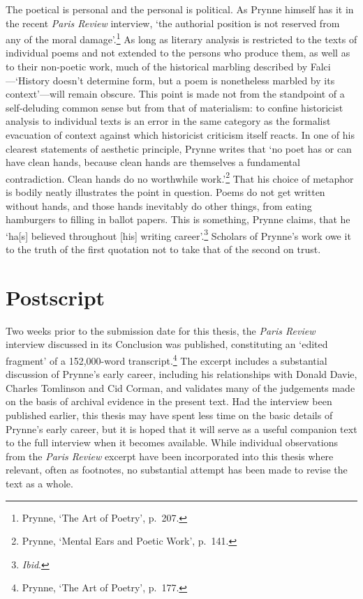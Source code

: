 \documentclass[]{article}
\begin{document}
The poetical is personal and the personal is political. As Prynne
himself has it in the recent \emph{Paris Review} interview, ‘the
authorial position is not reserved from any of the moral
damage’.\footnote{Prynne, ‘The Art of Poetry’, p.~207.} As long as
literary analysis is restricted to the texts of individual poems and not
extended to the persons who produce them, as well as to their non-poetic
work, much of the historical marbling described by Falci—‘History
doesn’t determine form, but a poem is nonetheless marbled by its
context’—will remain obscure. This point is made not from the standpoint
of a self-deluding common sense but from that of materialism: to confine
historicist analysis to individual texts is an error in the same
category as the formalist evacuation of context against which
historicist criticism itself reacts. In one of his clearest statements
of aesthetic principle, Prynne writes that ‘no poet has or can have
clean hands, because clean hands are themselves a fundamental
contradiction. Clean hands do no worthwhile work.’\footnote{Prynne,
  ‘Mental Ears and Poetic Work’, p.~141.} That his choice of metaphor is
bodily neatly illustrates the point in question. Poems do not get
written without hands, and those hands inevitably do other things, from
eating hamburgers to filling in ballot papers. This is something, Prynne
claims, that he ‘ha{[}s{]} believed throughout {[}his{]} writing
career’.\footnote{\emph{Ibid}.} Scholars of Prynne’s work owe it to the
truth of the first quotation not to take that of the second on trust.
\newpage

\section{Postscript}\label{postscript}

Two weeks prior to the submission date for this thesis, the \emph{Paris
Review} interview discussed in its Conclusion was published,
constituting an ‘edited fragment’ of a 152,000-word
transcript.\footnote{Prynne, ‘The Art of Poetry’, p.~177.} The excerpt
includes a substantial discussion of Prynne’s early career, including
his relationships with Donald Davie, Charles Tomlinson and Cid Corman,
and validates many of the judgements made on the basis of archival
evidence in the present text. Had the interview been published earlier,
this thesis may have spent less time on the basic details of Prynne’s
early career, but it is hoped that it will serve as a useful companion
text to the full interview when it becomes available. While individual
observations from the \emph{Paris Review} excerpt have been incorporated
into this thesis where relevant, often as footnotes, no substantial
attempt has been made to revise the text as a whole. \newpage
\end{document}
